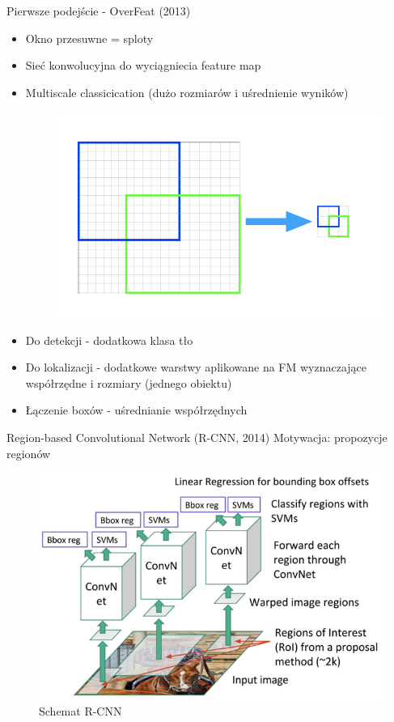 \documentclass[11pt]{beamer}
\begin{document}
\begin{frame}{Pierwsze podejście - OverFeat (2013)}
    \begin{itemize}
        \item Okno przesuwne = sploty
        \item Sieć konwolucyjna do wyciągniecia feature map
        \item Multiscale classicication (dużo rozmiarów i uśrednienie wyników)
        \begin{figure}[H]
        \includegraphics[height=0.3\textheight]{grafika/multiscale.png}
        \end{figure}
        \item Do detekcji - dodatkowa klasa tło
        \item Do lokalizacji - dodatkowe warstwy aplikowane na FM wyznaczające współrzędne i rozmiary (jednego obiektu)
        \item Łączenie boxów - uśrednianie współrzędnych
    \end{itemize}
\end{frame}


\begin{frame}{Region-based Convolutional Network (R-CNN, 2014)}
Motywacja: propozycje regionów
\begin{figure}
    \centering
    \includegraphics[width=\textwidth]{grafika/rcnn.png}
    \caption{Schemat R-CNN}
    \label{fig_rcnn1}
\end{figure}
\end{frame}
\end{document}
